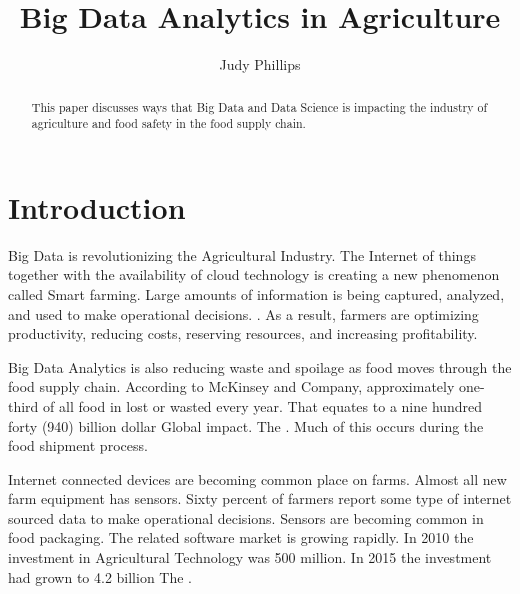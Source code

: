 \documentclass[sigconf]{acmart}
\begin{document}
\title{Big Data Analytics in Agriculture}


\author{Judy Phillips}

\renewcommand{\shortauthors}{B. Trovato et al.}


\begin{abstract}
This paper discusses ways that Big Data and Data Science is impacting the industry of agriculture and food safety in the food supply chain.
\end{abstract}



\maketitle

\section{Introduction}

Big Data is revolutionizing the Agricultural Industry. The Internet of things together with the availability of cloud technology is creating a new phenomenon called Smart farming. Large amounts of information is being captured, analyzed, and used to make operational decisions.  \cite{book}. As a result, farmers are optimizing productivity, reducing costs, reserving resources, and increasing profitability. 

Big Data Analytics is also reducing waste and spoilage as food moves through the food supply chain.  According to McKinsey and Company,  approximately one-third of all food in lost or wasted every year. That equates to a nine hundred forty (940) billion dollar Global impact. The \cite{www-google}. Much of this occurs during the food shipment process.  

Internet connected devices are becoming common place on farms. Almost all new farm equipment has sensors. Sixty percent of farmers report some type of internet sourced data to make operational decisions. Sensors are becoming common in food packaging. The related software market is growing rapidly. In 2010 the investment in Agricultural Technology was 500 million. In 2015 the investment had grown to 4.2 billion The \cite{book}. 
\end{document}
